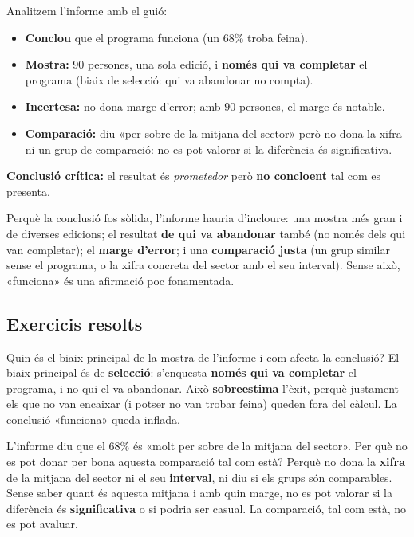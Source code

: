 \begin{exemple}
Analitzem l'informe amb el guió:
\begin{itemize}[leftmargin=1.4em, itemsep=2pt]
  \item \textbf{Conclou} que el programa funciona (un $68\%$ troba feina).
  \item \textbf{Mostra:} $90$ persones, una sola edició, i \textbf{només qui va completar}
        el programa (biaix de selecció: qui va abandonar no compta).
  \item \textbf{Incertesa:} no dona marge d'error; amb $90$ persones, el marge és notable.
  \item \textbf{Comparació:} diu «per sobre de la mitjana del sector» però no dona la xifra
        ni un grup de comparació: no es pot valorar si la diferència és significativa.
\end{itemize}
\textbf{Conclusió crítica:} el resultat és \emph{prometedor} però \textbf{no concloent}
tal com es presenta.
\end{exemple}

\begin{exemple}
Perquè la conclusió fos sòlida, l'informe hauria d'incloure: una mostra més gran i de
diverses edicions; el resultat \textbf{de qui va abandonar} també (no només dels qui van
completar); el \textbf{marge d'error}; i una \textbf{comparació justa} (un grup similar sense
el programa, o la xifra concreta del sector amb el seu interval). Sense això, «funciona» és
una afirmació poc fonamentada.
\end{exemple}

\subsection{Exercicis resolts}

\begin{exresolt}
Quin és el biaix principal de la mostra de l'informe i com afecta la conclusió?
\solucio
El biaix principal és de \textbf{selecció}: s'enquesta \textbf{només qui va completar} el
programa, i no qui el va abandonar. Això \textbf{sobreestima} l'èxit, perquè justament els
que no van encaixar (i potser no van trobar feina) queden fora del càlcul. La conclusió
«funciona» queda inflada.
\end{exresolt}

\begin{exresolt}
L'informe diu que el $68\%$ és «molt per sobre de la mitjana del sector». Per què no es pot
donar per bona aquesta comparació tal com està?
\solucio
Perquè no dona la \textbf{xifra} de la mitjana del sector ni el seu \textbf{interval}, ni
diu si els grups són comparables. Sense saber quant és aquesta mitjana i amb quin marge, no
es pot valorar si la diferència és \textbf{significativa} o si podria ser casual. La
comparació, tal com està, no es pot avaluar.
\end{exresolt}

